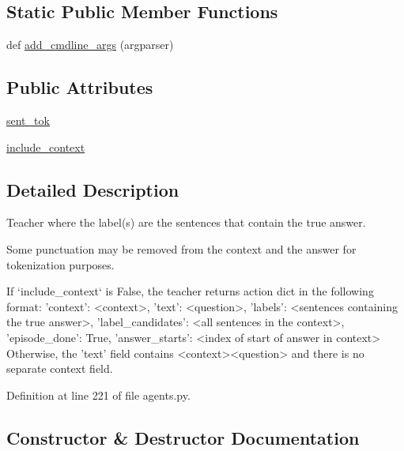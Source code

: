 \subsection*{Static Public Member Functions}
\begin{DoxyCompactItemize}
\item 
def \hyperlink{classparlai_1_1tasks_1_1squad_1_1agents_1_1SentenceTeacher_a7cbe635ae17b8deee040f3f23e9163fa}{add\+\_\+cmdline\+\_\+args} (argparser)
\end{DoxyCompactItemize}
\subsection*{Public Attributes}
\begin{DoxyCompactItemize}
\item 
\hyperlink{classparlai_1_1tasks_1_1squad_1_1agents_1_1SentenceTeacher_a35acf467970e62528b74dd9a3dcc45a9}{sent\+\_\+tok}
\item 
\hyperlink{classparlai_1_1tasks_1_1squad_1_1agents_1_1SentenceTeacher_a499aa8bdcd4d4af34d87a79fe7186854}{include\+\_\+context}
\end{DoxyCompactItemize}


\subsection{Detailed Description}
\begin{DoxyVerb}Teacher where the label(s) are the sentences that contain the true answer.

Some punctuation may be removed from the context and the answer for
tokenization purposes.

If `include_context` is False, the teacher returns action dict in the
following format:
{
    'context': <context>,
    'text': <question>,
    'labels': <sentences containing the true answer>,
    'label_candidates': <all sentences in the context>,
    'episode_done': True,
    'answer_starts': <index of start of answer in context>
}
Otherwise, the 'text' field contains <context>\n<question> and there is
no separate context field.
\end{DoxyVerb}
 

Definition at line 221 of file agents.\+py.



\subsection{Constructor \& Destructor Documentation}
\mbox{\label{classparlai_1_1tasks_1_1squad_1_1agents_1_1SentenceTeacher_ae193e2962a772dc370f05077330c05c6}} 
